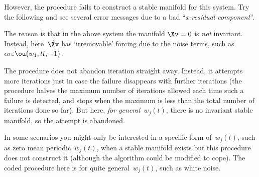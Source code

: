 However, the procedure fails to construct a stable manifold for this system.  Try the following and see several error messages due to a bad ``\emph{x-residual component}''.
The reason is that in the above system the manifold \(\Xv=0\) is \emph{not} invariant.  Instead, here~\(\dot\Xv\) has `irremovable' forcing due to the noise terms, such as \( \epsilon \sigma \eps \ou\big(w_1,tt,-1\big)\).

The procedure does not abandon iteration straight away.  Instead, it attempts more iterations just in case the failure disappears with further iterations (the procedure halves the maximum number of iterations allowed each time such a failure is detected, and stops when the maximum is less than the total number of iterations done so far).  But here, \emph{for general~\(w_j(t)\)}, there is no invariant stable manifold, so the attempt is abandoned.

In some scenarios you might only be interested in a specific form of~\(w_j(t)\), such as zero mean periodic~\(w_j(t)\), when a stable manifold exists but this procedure does not construct it (although the algorithm could be modified to cope).
The coded procedure here is for quite general~\(w_j(t)\), such as white noise. 

